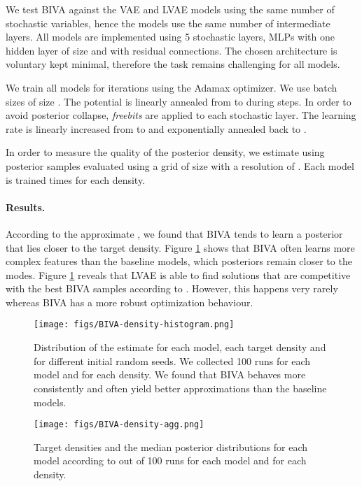 \documentclass{article}
\def\nm{BIVA\xspace}
\begin{document}
We test \nm against the VAE and LVAE models using the same number of stochastic variables, hence the models use the same number of intermediate layers. All models are implemented using 5 stochastic layers, MLPs with one hidden layer of size  and with residual connections. The chosen architecture is voluntary kept minimal, therefore the task remains challenging for all models.

We train all models for  iterations using the Adamax optimizer. We use batch sizes of size . The potential is linearly annealed from  to  during  steps. In order to avoid posterior collapse,  \textit{freebits} are applied to each stochastic layer. The learning rate is linearly increased from  to  and exponentially annealed back to .

In order to measure the quality of the posterior density, we estimate  using  posterior samples evaluated using a grid of size  with a resolution of . Each model is trained  times for each density.

\paragraph{Results.}

According to the approximate , we found that \nm tends to learn a posterior that lies closer to the target density. Figure \ref{fig:2ddensity_bar} shows that \nm often learns more complex features than the baseline models, which posteriors remain closer to the modes. Figure \ref{fig:2ddensity_bar} reveals that LVAE is able to find solutions that are competitive with the best \nm samples according to . However, this happens very rarely whereas \nm has a more robust optimization behaviour. 

\begin{figure}[!h]
\centering
\texttt{[image: figs/BIVA-density-histogram.png]}
\caption{Distribution of the  estimate for each model, each target density  and for different initial random seeds. We collected 100 runs for each model and for each density. We found that \nm behaves more consistently and often yield better approximations than the baseline models.}\label{fig:2ddensity_bar}
\end{figure}

\begin{figure}[!h]
\centering
\texttt{[image: figs/BIVA-density-agg.png]}
\caption{Target densities  and the median posterior distributions  for each model according to  out of 100 runs for each model and for each density.}\label{fig:2ddensity_agg}
\end{figure}
\end{document}
